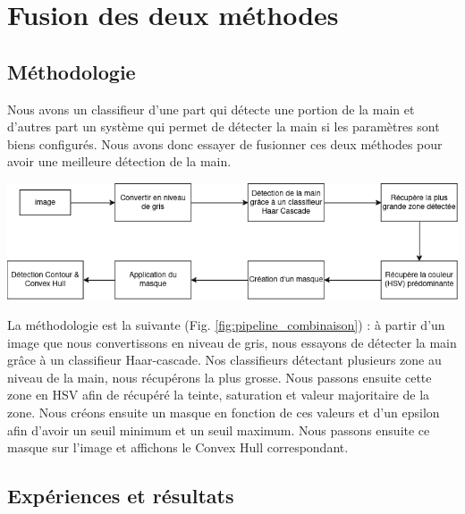 \documentclass[11pt]{article}
\begin{document}
\section{Fusion des deux méthodes}
\subsection{Méthodologie}
Nous avons un classifieur d'une part qui détecte une portion de la main et d'autres part un système qui permet de détecter la main si les paramètres sont biens configurés. Nous avons donc essayer de fusionner ces deux méthodes pour avoir une meilleure détection de la main. 

\begin{center}
    \includegraphics[width=\textwidth]{images/pipeline_combinaison.png}
    \label{fig:pipeline_combinaison}
\end{center}

La méthodologie est la suivante (Fig. \ref{fig:pipeline_combinaison}) : à partir d'un image que nous convertissons en niveau de gris, nous essayons de détecter la main grâce à un classifieur Haar-cascade. Nos classifieurs détectant plusieurs zone au niveau de la main, nous récupérons la plus grosse. Nous passons ensuite cette zone en HSV afin de récupéré la teinte, saturation et valeur majoritaire de la zone. Nous créons ensuite un masque en fonction de ces valeurs et d'un epsilon afin d'avoir un seuil minimum et un seuil maximum. Nous passons ensuite ce masque sur l'image et affichons le Convex Hull correspondant.  

\subsection{Expériences et résultats}
\end{document}
